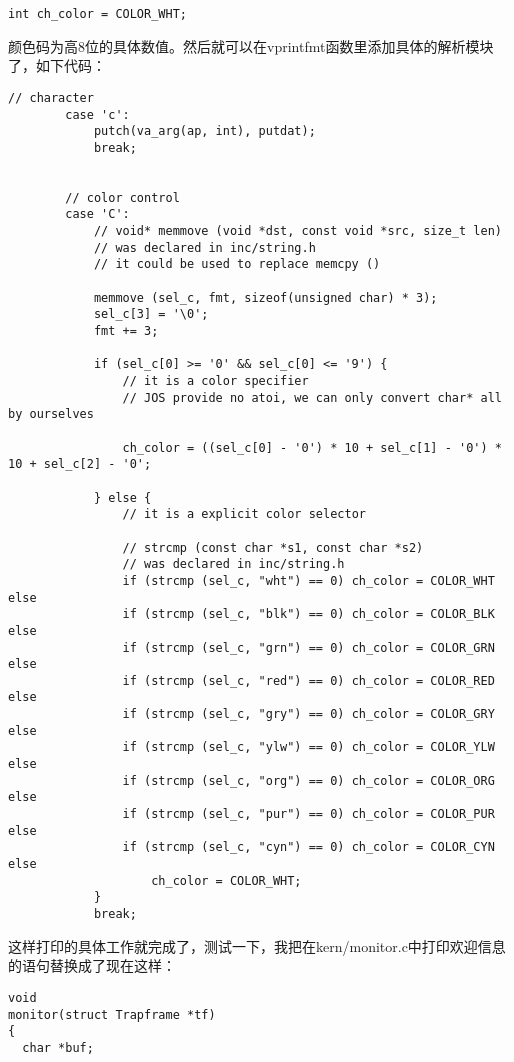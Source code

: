 \documentclass{article}
\newcommand{\funcname}[1]{{\ttfamily \small #1}}
\begin{document}
\begin{CJK*}{UTF8}{gkai}
\begin{lstlisting}[style=ccode, title={\scriptsize \ttfamily \bfseries lib/printfmt.c}]
int ch_color = COLOR_WHT;
\end{lstlisting}

颜色码为高8位的具体数值。然后就可以在\funcname{vprintfmt}函数里添加具体的解析模块了，如下代码：

\begin{lstlisting}[style=ccode, firstnumber=172, title={\scriptsize \ttfamily \bfseries lib/printfmt.c}]
        // character
        case 'c':
            putch(va_arg(ap, int), putdat);
            break;


        // color control
        case 'C':
            // void* memmove (void *dst, const void *src, size_t len) 
            // was declared in inc/string.h
            // it could be used to replace memcpy ()

            memmove (sel_c, fmt, sizeof(unsigned char) * 3);
            sel_c[3] = '\0';
            fmt += 3;

            if (sel_c[0] >= '0' && sel_c[0] <= '9') {
                // it is a color specifier
                // JOS provide no atoi, we can only convert char* all by ourselves
           
                ch_color = ((sel_c[0] - '0') * 10 + sel_c[1] - '0') * 10 + sel_c[2] - '0';

            } else {
                // it is a explicit color selector
                
                // strcmp (const char *s1, const char *s2) 
                // was declared in inc/string.h
                if (strcmp (sel_c, "wht") == 0) ch_color = COLOR_WHT else
                if (strcmp (sel_c, "blk") == 0) ch_color = COLOR_BLK else
                if (strcmp (sel_c, "grn") == 0) ch_color = COLOR_GRN else
                if (strcmp (sel_c, "red") == 0) ch_color = COLOR_RED else
                if (strcmp (sel_c, "gry") == 0) ch_color = COLOR_GRY else
                if (strcmp (sel_c, "ylw") == 0) ch_color = COLOR_YLW else
                if (strcmp (sel_c, "org") == 0) ch_color = COLOR_ORG else
                if (strcmp (sel_c, "pur") == 0) ch_color = COLOR_PUR else
                if (strcmp (sel_c, "cyn") == 0) ch_color = COLOR_CYN else
                    ch_color = COLOR_WHT;
            }
            break;
\end{lstlisting}

这样打印的具体工作就完成了，测试一下，我把在kern/monitor.c中打印欢迎信息的语句替换成了现在这样：

\begin{lstlisting}[style=ccode, title={\scriptsize \ttfamily \bfseries kern/monitor.c}]
void
monitor(struct Trapframe *tf)
{
  char *buf;


\end{lstlisting}
\end{CJK*}
\end{document}
